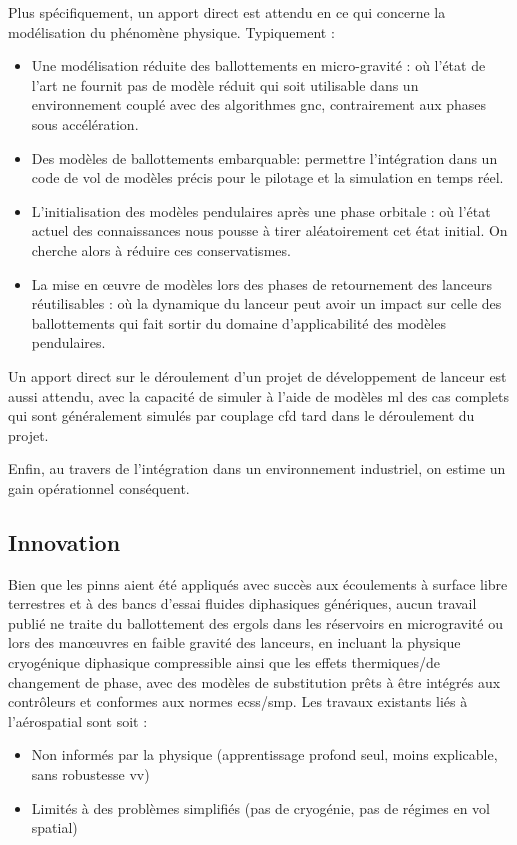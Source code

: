 \documentclass[12pt]{article}
\begin{document}
	Plus spécifiquement, un apport direct est attendu en ce qui concerne la modélisation du phénomène physique. Typiquement :
	\begin{itemize}
		\item Une modélisation réduite des ballottements en micro-gravité : où l'état de l'art ne fournit pas de modèle réduit qui soit utilisable dans un environnement couplé avec des algorithmes \acrshort{gnc}, contrairement aux phases sous accélération.
		\item Des modèles de ballottements embarquable: permettre l'intégration dans un code de vol de modèles précis pour le pilotage et la simulation en temps réel.
		\item L'initialisation des modèles pendulaires après une phase orbitale : où l'état actuel des connaissances nous pousse à tirer aléatoirement cet état initial. On cherche alors à réduire ces conservatismes.
		\item La mise en œuvre de modèles lors des phases de retournement des lanceurs réutilisables : où la dynamique du lanceur peut avoir un impact sur celle des ballottements qui fait sortir du domaine d'applicabilité des modèles pendulaires.
	\end{itemize}
	Un apport direct sur le déroulement d'un projet de développement de lanceur est aussi attendu, avec la capacité de simuler à l'aide de modèles \acrshort{ml} des cas complets qui sont généralement simulés par couplage \acrshort{cfd} tard dans le déroulement du projet.
	
	Enfin, au travers de l'intégration dans un environnement industriel, on estime un gain opérationnel conséquent.
	
	\subsection*{Innovation}
	
	Bien que les \gls{pinn}s aient été appliqués avec succès aux écoulements à surface libre terrestres et à des bancs d’essai fluides diphasiques génériques, aucun travail publié ne traite du ballottement des ergols dans les réservoirs en microgravité ou lors des manœuvres en faible gravité des lanceurs, en incluant la physique cryogénique diphasique compressible ainsi que les effets thermiques/de changement de phase, avec des modèles de substitution prêts à être intégrés aux contrôleurs et conformes aux normes \acrshort{ecss}/\acrshort{smp}.
	Les travaux existants liés à l’aérospatial sont soit :
	
	\begin{itemize}
		\item Non informés par la physique (apprentissage profond seul, moins explicable, sans robustesse \acrshort{vv})
		\item Limités à des problèmes simplifiés (pas de cryogénie, pas de régimes en vol spatial)
	\end{itemize}
	
\end{document}
